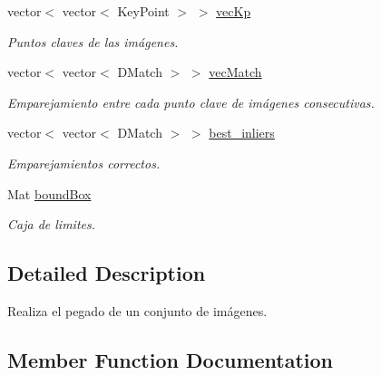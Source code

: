 \begin{DoxyCompactItemize}
\mbox{\label{classuav_1_1Stitcher_af1e3706aa47771911eb5429ade12c287}} 
vector$<$ vector$<$ Key\+Point $>$ $>$ \mbox{\hyperlink{classuav_1_1Stitcher_af1e3706aa47771911eb5429ade12c287}{vec\+Kp}}
\begin{DoxyCompactList}\small\item\em Puntos claves de las imágenes. \end{DoxyCompactList}\item 
\mbox{\label{classuav_1_1Stitcher_a31fb6a699efa47ae64fe109201ef216c}} 
vector$<$ vector$<$ D\+Match $>$ $>$ \mbox{\hyperlink{classuav_1_1Stitcher_a31fb6a699efa47ae64fe109201ef216c}{vec\+Match}}
\begin{DoxyCompactList}\small\item\em Emparejamiento entre cada punto clave de imágenes consecutivas. \end{DoxyCompactList}\item 
\mbox{\label{classuav_1_1Stitcher_a3aecc00facecd4f6952594b76cf4ea52}} 
vector$<$ vector$<$ D\+Match $>$ $>$ \mbox{\hyperlink{classuav_1_1Stitcher_a3aecc00facecd4f6952594b76cf4ea52}{best\+\_\+inliers}}
\begin{DoxyCompactList}\small\item\em Emparejamientos correctos. \end{DoxyCompactList}\item 
\mbox{\label{classuav_1_1Stitcher_a6f27d69501dd482cf217de22ca57fd13}} 
Mat \mbox{\hyperlink{classuav_1_1Stitcher_a6f27d69501dd482cf217de22ca57fd13}{bound\+Box}}
\begin{DoxyCompactList}\small\item\em Caja de limites. \end{DoxyCompactList}\end{DoxyCompactItemize}


\subsection{Detailed Description}
Realiza el pegado de un conjunto de imágenes. 

\subsection{Member Function Documentation}
\mbox{\label{classuav_1_1Stitcher_a0745fd6db5669c1f9bce1b637c2be163}} 
